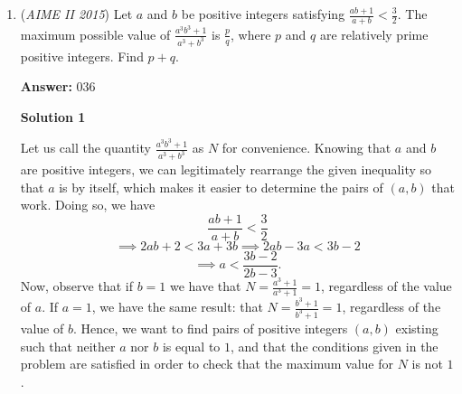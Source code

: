 \begin{enumerate}
 
            \begin{enumerate}[label=(\roman*)]
                \item $h = \frac{1}{2}H = \frac{18}{5}$
            \end{enumerate}
            Our test point is $(\omega, Area) = \left(\frac{25}{2}, \frac{25}{2} \cdot \frac{18}{5}\right) = \left(\frac{25}{2}, 45\right)$.

 \textbf{Step 4: Solve for beta} Substitute the point into our quadratic equation:

 
            \begin{enumerate}[label=(\roman*)]
                \item $45 = k\left(\frac{25}{2}\right)\left(\frac{25}{2} - 25\right)$\item $45 = k\left(\frac{25}{2}\right)\left(-\frac{25}{2}\right)$\item $45 = -\frac{625}{4}k$\item $k = -\frac{180}{625} = -\frac{36}{125}$
            \end{enumerate}
            Since $\beta = -k$, we have $\beta = \frac{36}{125}$. The values $m=36$ and $n=125$ are relatively prime, so $m+n = 36 + 125 = \boxed{161}$.

 


 


	\item (\textit{AIME II 2015}) Let $a$ and $b$ be positive integers satisfying $\frac{ab+1}{a+b} < \frac{3}{2}$. The maximum possible value of $\frac{a^3b^3+1}{a^3+b^3}$ is $\frac{p}{q}$, where $p$ and $q$ are relatively prime positive integers. Find $p+q$.


 
 \textbf{Answer: }036



\textbf{Solution 1}

Let us call the quantity $\frac{a^3b^3+1}{a^3+b^3}$ as $N$ for convenience. Knowing that $a$ and $b$ are positive integers, we can legitimately rearrange the given inequality so that $a$ is by itself, which makes it easier to determine the pairs of $(a, b)$ that work. Doing so, we have 
 \[\frac{ab+1}{a+b} < \frac{3}{2}\] 
 \[\implies 2ab + 2 < 3a + 3b \implies 2ab - 3a < 3b - 2\] 
 \[\implies a < \frac{3b - 2}{2b - 3}.\] Now, observe that if $b = 1$ we have that $N = \frac{a^3 + 1}{a^3 + 1} = 1$, regardless of the value of $a$. If $a = 1$, we have the same result: that $N = \frac{b^3 + 1}{b^3 + 1} = 1$, regardless of the value of $b$. Hence, we want to find pairs of positive integers $(a, b)$ existing such that neither $a$ nor $b$ is equal to $1$, and that the conditions given in the problem are satisfied in order to check that the maximum value for $N$ is not $1$.


\end{enumerate}
